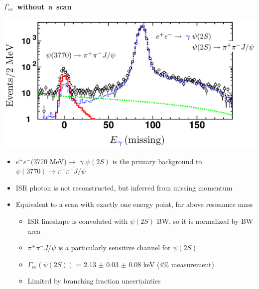 \documentclass[landscape]{article}
\newenvironment{slide}[1][ ]{\mbox{\bf #1 } \vfill}{\vfill \mbox{ } \pagebreak}
\begin{document}
\begin{slide}[\boldmath $\Gamma_{ee}$ without a scan]

\begin{center}
  \includegraphics[width=0.7\linewidth]{psi_gamee2}
\end{center}

\begin{itemize}\setlength{\itemsep}{0.4 cm}

  \item $e^+e^-($3770 MeV$) \to$ {\boldmath \color{purple} $\gamma$}
  $\psi(2S)$ is the primary background to $\psi(3770) \to \pi^+\pi^- J/\psi$

  \item {\color{purple} ISR photon} is not reconstructed, but inferred
  from missing momentum

  \item Equivalent to a scan with exactly one energy point, far above
  resonance mass

  \vspace{0.2 cm}
  \begin{itemize}\setlength{\itemsep}{0.4 cm}

    \item ISR lineshape is convoluted with $\psi(2S)$ BW, so it is
    normalized by BW area

    \item $\pi^+\pi^- J/\psi$ is a particularly sensitive channel for $\psi(2S)$

    \item $\Gamma_{ee}(\psi(2S))$ = 2.13 $\pm$ 0.03 $\pm$ 0.08 keV
    (4\% measurement)

    \item Limited by branching fraction uncertainties

  \end{itemize}

\end{itemize}

\vspace{-1 cm}

\end{slide}
\end{document}
